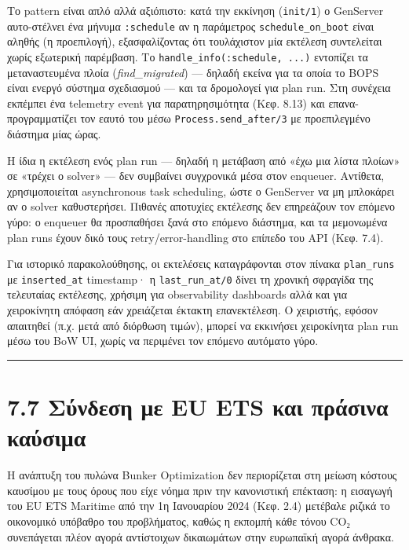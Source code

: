 Το pattern είναι απλό αλλά αξιόπιστο: κατά την εκκίνηση
(\texttt{init/1}) ο GenServer αυτο-στέλνει ένα μήνυμα \texttt{:schedule}
αν η παράμετρος \texttt{schedule\_on\_boot} είναι αληθής (η προεπιλογή),
εξασφαλίζοντας ότι τουλάχιστον μία εκτέλεση συντελείται χωρίς εξωτερική
παρέμβαση. Το \texttt{handle\_info(:schedule,\ ...)} εντοπίζει τα
μεταναστευμένα πλοία (\emph{find\_migrated}) --- δηλαδή εκείνα για τα
οποία το BOPS είναι ενεργό σύστημα σχεδιασμού --- και τα δρομολογεί για
plan run. Στη συνέχεια εκπέμπει ένα telemetry event για παρατηρησιμότητα
(Κεφ. 8.13) και επανα-προγραμματίζει τον εαυτό του μέσω
\texttt{Process.send\_after/3} με προεπιλεγμένο διάστημα μίας ώρας.

Η ίδια η εκτέλεση ενός plan run --- δηλαδή η μετάβαση από «έχω μια λίστα
πλοίων» σε «τρέχει ο solver» --- δεν συμβαίνει συγχρονικά μέσα στον
enqueuer. Αντίθετα, χρησιμοποιείται asynchronous task scheduling, ώστε ο
GenServer να μη μπλοκάρει αν ο solver καθυστερήσει. Πιθανές αποτυχίες
εκτέλεσης δεν επηρεάζουν τον επόμενο γύρο: ο enqueuer θα προσπαθήσει
ξανά στο επόμενο διάστημα, και τα μεμονωμένα plan runs έχουν δικό τους
retry/error-handling στο επίπεδο του API (Κεφ. 7.4).

Για ιστορικό παρακολούθησης, οι εκτελέσεις καταγράφονται στον πίνακα
\texttt{plan\_runs} με \texttt{inserted\_at} timestamp· η
\texttt{last\_run\_at/0} δίνει τη χρονική σφραγίδα της τελευταίας
εκτέλεσης, χρήσιμη για observability dashboards αλλά και για χειροκίνητη
απόφαση εάν χρειάζεται έκτακτη επανεκτέλεση. Ο χειριστής, εφόσον
απαιτηθεί (π.χ. μετά από διόρθωση τιμών), μπορεί να εκκινήσει
χειροκίνητα plan run μέσω του BoW UI, χωρίς να περιμένει τον επόμενο
αυτόματο γύρο.

\begin{center}\rule{0.5\linewidth}{0.5pt}\end{center}

\section{7.7 Σύνδεση με EU ETS και πράσινα
καύσιμα}\label{ux3c3ux3cdux3bdux3b4ux3b5ux3c3ux3b7-ux3bcux3b5-eu-ets-ux3baux3b1ux3b9-ux3c0ux3c1ux3acux3c3ux3b9ux3bdux3b1-ux3baux3b1ux3cdux3c3ux3b9ux3bcux3b1}

Η ανάπτυξη του πυλώνα Bunker Optimization δεν περιορίζεται στη μείωση
κόστους καυσίμου με τους όρους που είχε νόημα πριν την κανονιστική
επέκταση: η εισαγωγή του EU ETS Maritime από την 1η Ιανουαρίου 2024
(Κεφ. 2.4) μετέβαλε ριζικά το οικονομικό υπόβαθρο του προβλήματος, καθώς
η εκπομπή κάθε τόνου CO₂ συνεπάγεται πλέον αγορά αντίστοιχων δικαιωμάτων
στην ευρωπαϊκή αγορά άνθρακα.

